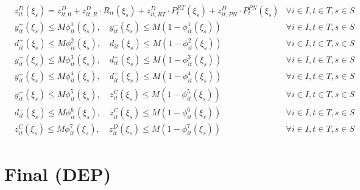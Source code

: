 \documentclass[10pt]{article}
\begin{document}
\begin{subequations}
\begin{align}
        & z^D_{it}(\xi_s) = z^D_{it,0} + z^D_{it,R} \cdot R_{it}(\xi_s) + z^D_{it,RT} \cdot P^{RT}_t(\xi_s) + z^D_{it,PN} \cdot P^{PN}_t(\xi_s) & \forall i \in I, t \in T, s \in S \\
        & y^+_{it}(\xi_s) \leq M \phi^1_{it}(\xi_s), \quad y^-_{it}(\xi_s) \leq M (1 - \phi^1_{it}(\xi_s)) & \forall i \in I, t \in T, s \in S \\
        & d^+_{it}(\xi_s) \leq M \phi^2_{it}(\xi_s), \quad d^-_{it}(\xi_s) \leq M (1 - \phi^2_{it}(\xi_s)) & \forall i \in I, t \in T, s \in S \\
        & y^+_{it}(\xi_s) \leq M \phi^3_{it}(\xi_s), \quad d^-_{it}(\xi_s) \leq M (1 - \phi^3_{it}(\xi_s)) & \forall i \in I, t \in T, s \in S \\
        & y^-_{it}(\xi_s) \leq M \phi^4_{it}(\xi_s), \quad d^+_{it}(\xi_s) \leq M (1 - \phi^4_{it}(\xi_s)) & \forall i \in I, t \in T, s \in S \\
        & y^-_{it}(\xi_s) \leq M \phi^5_{it}(\xi_s), \quad z^C_{it}(\xi_s) \leq M (1 - \phi^5_{it}(\xi_s)) & \forall i \in I, t \in T, s \in S \\
        & d^-_{it}(\xi_s) \leq M \phi^6_{it}(\xi_s), \quad z^C_{it}(\xi_s) \leq M (1 - \phi^6_{it}(\xi_s)) & \forall i \in I, t \in T, s \in S \\
        & z^C_{it}(\xi_s) \leq M \phi^7_{it}(\xi_s), \quad z^D_{it}(\xi_s) \leq M (1 - \phi^7_{it}(\xi_s)) & \forall i \in I, t \in T, s \in S
    \end{align}
\end{subequations}

\newpage
\section{Final (DEP)}
\end{document}
